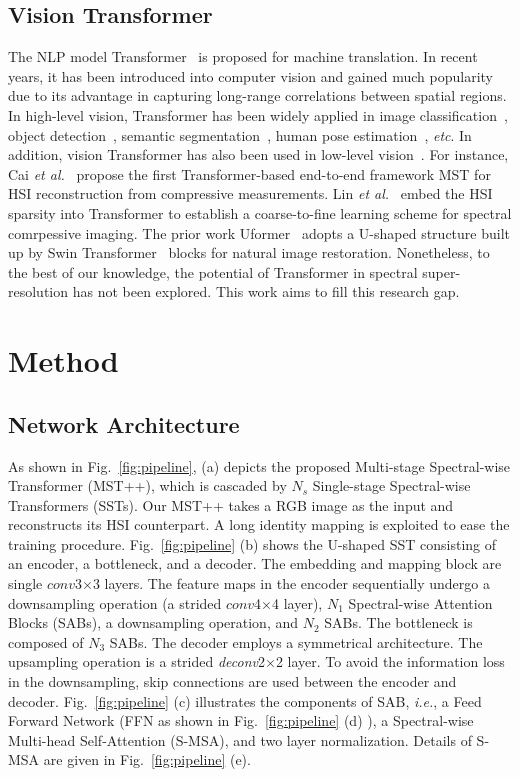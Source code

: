 \documentclass[10pt,twocolumn,letterpaper]{article}
\begin{document}
\subsection{Vision Transformer}
\noindent The NLP model Transformer~\cite{vaswani2017attention} is  proposed for machine translation. In recent years, it has been introduced into computer vision and gained much popularity due to its advantage in capturing long-range correlations between spatial regions. In high-level vision, Transformer has been widely applied in image classification~\cite{liu2021swin,arnab2021vivit,global_msa,xcit,tc_2,tc_1}, object detection~\cite{de_detr,DETR,dy_detr,to_3,to_2,to_1}, semantic segmentation~\cite{tc_3,cao2021swin,SETR,ts_1,ts_2,ts_3}, human pose estimation~\cite{tokenpose,transpose,rsn,cai2019joint,udp++,prtr,th_1,th_2,th_3},  \emph{etc}. In addition, vision Transformer has also been used in low-level vision~\cite{mst,vsrt,ipt,rformer,swinir,fgst,cst}. For instance, Cai \emph{et al.}~\cite{mst} propose the first Transformer-based end-to-end framework MST for HSI reconstruction from compressive measurements. Lin \emph{et al.}~\cite{cst} embed the HSI sparsity into Transformer to establish a coarse-to-fine learning scheme for spectral comrpessive imaging. The prior work Uformer~\cite{uformer} adopts a U-shaped structure built up by Swin Transformer~\cite{liu2021swin} blocks for natural image restoration. Nonetheless, to the best of our knowledge, the potential of Transformer in spectral super-resolution has not been explored. This work aims to fill this research gap.

\section{Method}
\subsection{Network Architecture}
As shown in Fig.~\ref{fig:pipeline}, (a) depicts the proposed Multi-stage Spectral-wise Transformer (MST++), which is cascaded by $N_s$ Single-stage Spectral-wise Transformers (SSTs). Our MST++ takes a RGB image as the input and reconstructs its HSI counterpart. A long identity mapping is exploited to ease the training procedure. Fig.~\ref{fig:pipeline} (b) shows the U-shaped SST consisting of an encoder, a bottleneck, and a decoder. The embedding and mapping block are single $conv$3$\times$3 layers. The feature maps in the encoder sequentially undergo a downsampling operation (a strided $conv$4$\times$4 layer), $N_1$ Spectral-wise Attention Blocks (SABs), a downsampling operation, and $N_2$ SABs. The bottleneck is composed of $N_3$ SABs. The decoder employs a symmetrical architecture. The upsampling operation is a strided \emph{deconv}2$\times$2 layer. To avoid the information loss in the downsampling, skip connections are used between the encoder and decoder. Fig.~\ref{fig:pipeline} (c) illustrates the components of SAB, \emph{i.e.}, a Feed Forward Network (FFN as shown in Fig.~\ref{fig:pipeline} (d) ), a Spectral-wise Multi-head Self-Attention (S-MSA), and two layer normalization. Details of S-MSA are given in Fig.~\ref{fig:pipeline} (e).
\end{document}
